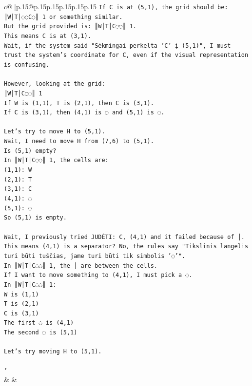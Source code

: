 \documentclass{article}
\begin{document}
{\begin{supertabular}{c@{$\;$}|p{.15\linewidth}@{}p{.15\linewidth}p{.15\linewidth}p{.15\linewidth}p{.15\linewidth}p{.15\linewidth}}
{{{\texttt{If C is at (5,1), the grid should be:} \\
\texttt{║W│T│◌◌C◌║ 1 or something similar.} \\
\texttt{But the grid provided is: ║W│T│C◌◌║ 1.} \\
\texttt{This means C is at (3,1).} \\
\texttt{Wait, if the system said "Sėkmingai perkelta 'C' į (5,1)", I must trust the system's coordinate for C, even if the visual representation is confusing.} \\
\\ 
\texttt{However, looking at the grid:} \\
\texttt{║W│T│C◌◌║ 1} \\
\texttt{If W is (1,1), T is (2,1), then C is (3,1).} \\
\texttt{If C is (3,1), then (4,1) is ◌ and (5,1) is ◌.} \\
\\ 
\texttt{Let's try to move H to (5,1).} \\
\texttt{Wait, I need to move H from (7,6) to (5,1).} \\
\texttt{Is (5,1) empty?} \\
\texttt{In ║W│T│C◌◌║ 1, the cells are:} \\
\texttt{(1,1): W} \\
\texttt{(2,1): T} \\
\texttt{(3,1): C} \\
\texttt{(4,1): ◌} \\
\texttt{(5,1): ◌} \\
\texttt{So (5,1) is empty.} \\
\\ 
\texttt{Wait, I previously tried JUDĖTI: C, (4,1) and it failed because of │.} \\
\texttt{This means (4,1) is a separator? No, the rules say "Tikslinis langelis turi būti tuščias, jame turi būti tik simbolis '◌'".} \\
\texttt{In ║W│T│C◌◌║ 1, the │ are between the cells.} \\
\texttt{If I want to move something to (4,1), I must pick a ◌.} \\
\texttt{In ║W│T│C◌◌║ 1:} \\
\texttt{W is (1,1)} \\
\texttt{T is (2,1)} \\
\texttt{C is (3,1)} \\
\texttt{The first ◌ is (4,1)} \\
\texttt{The second ◌ is (5,1)} \\
\\ 
\texttt{Let's try moving H to (5,1).} \\
\\ 
\texttt{'} \\
            }
        }
    }
    & & \\ \\


\end{supertabular}}
\end{document}
